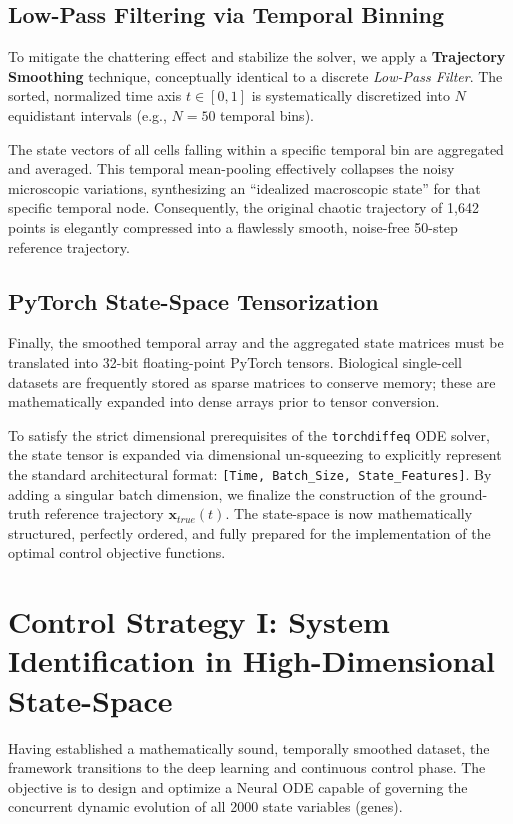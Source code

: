 \documentclass[12pt, a4paper]{article}
\begin{document}
	\subsection{Low-Pass Filtering via Temporal Binning}
	To mitigate the chattering effect and stabilize the solver, we apply a \textbf{Trajectory Smoothing} technique, conceptually identical to a discrete \textit{Low-Pass Filter}. The sorted, normalized time axis $t \in [0, 1]$ is systematically discretized into $N$ equidistant intervals (e.g., $N=50$ temporal bins). 
	
	The state vectors of all cells falling within a specific temporal bin are aggregated and averaged. This temporal mean-pooling effectively collapses the noisy microscopic variations, synthesizing an ``idealized macroscopic state'' for that specific temporal node. Consequently, the original chaotic trajectory of 1,642 points is elegantly compressed into a flawlessly smooth, noise-free 50-step reference trajectory.
	
	\subsection{PyTorch State-Space Tensorization}
	Finally, the smoothed temporal array and the aggregated state matrices must be translated into 32-bit floating-point PyTorch tensors. Biological single-cell datasets are frequently stored as sparse matrices to conserve memory; these are mathematically expanded into dense arrays prior to tensor conversion. 
	
	To satisfy the strict dimensional prerequisites of the \texttt{torchdiffeq} ODE solver, the state tensor is expanded via dimensional un-squeezing to explicitly represent the standard architectural format: \texttt{[Time, Batch\_Size, State\_Features]}. By adding a singular batch dimension, we finalize the construction of the ground-truth reference trajectory $\mathbf{x}_{true}(t)$. The state-space is now mathematically structured, perfectly ordered, and fully prepared for the implementation of the optimal control objective functions.
	
	\section{Control Strategy I: System Identification in High-Dimensional State-Space}
	
	Having established a mathematically sound, temporally smoothed dataset, the framework transitions to the deep learning and continuous control phase. The objective is to design and optimize a Neural ODE capable of governing the concurrent dynamic evolution of all 2000 state variables (genes). 
	
\end{document}
